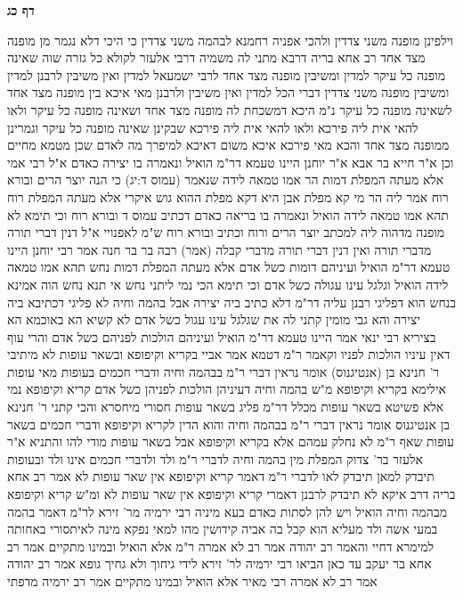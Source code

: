 \documentclass[12pt, openany]{book}
\newcommand{\sethebfont}{
\fontsize{10.5pt}{21.0pt} \selectfont
}
\newcommand{\twocol}[1]{
	{\sethebfont \begin{multicols}{2}
			#1
	\end{multicols}}	
}
\newcommand{\sectname}{}
\newcommand{\newsection}[1]{
	\addcontentsline{toc}{section}{#1}
	\renewcommand{\sectname}{#1}	
	\vspace{-\baselineskip}
	\begin{center}
		\textbf{%
\fontsize{16pt}{16pt}\selectfont
			#1}
	\end{center}
	\vspace{-\baselineskip}
	\nopagebreak
}
\begin{document}
\newsection{דף כג}
\twocol{וילפינן מופנה משני צדדין ולהכי אפניה רחמנא לבהמה משני צדדין כי היכי דלא נגמר מן מופנה מצד אחד 
רב אחא בריה דרבא מתני לה משמיה דרבי אלעזר לקולא כל גזרה שוה שאינה מופנה כל עיקר למדין ומשיבין מופנה מצד אחד לרבי ישמעאל למדין ואין משיבין לרבנן למדין ומשיבין מופנה משני צדדין דברי הכל למדין ואין משיבין 
ולרבנן מאי איכא בין מופנה מצד אחד לשאינה מופנה כל עיקר 
נ"מ היכא דמשכחת לה מופנה מצד אחד ושאינה מופנה כל עיקר ולאו להאי אית ליה פירכא ולאו להאי אית ליה פירכא שבקינן שאינה מופנה כל עיקר וגמרינן ממופנה מצד אחד 
והכא מאי פירכא איכא משום דאיכא למיפרך מה לאדם שכן מטמא מחיים 
וכן א"ר חייא בר אבא א"ר יוחנן היינו טעמא דר"מ הואיל ונאמרה בו יצירה כאדם 
א"ל רבי אמי אלא מעתה המפלת דמות הר אמו טמאה לידה שנאמר (עמוס ד:יג) כי הנה יוצר הרים ובורא רוח אמר ליה הר מי קא מפלת אבן היא דקא מפלת ההוא גוש איקרי
אלא מעתה המפלת רוח תהא אמו טמאה לידה הואיל ונאמרה בו בריאה כאדם דכתיב {עמוס ד } ובורא רוח וכי תימא לא מופנה מדהוה ליה למכתב יוצר הרים ורוח וכתיב ובורא רוח ש"מ לאפנויי 
א"ל דנין דברי תורה מדברי תורה ואין דנין דברי תורה מדברי קבלה 
(אמר) רבה בר בר חנה אמר רבי יוחנן היינו טעמא דר"מ הואיל ועיניהם דומות כשל אדם 
אלא מעתה המפלת דמות נחש תהא אמו טמאה לידה הואיל וגלגל עינו עגולה כשל אדם וכי תימא הכי נמי ליתני נחש 
אי תנא נחש הוה אמינא בנחש הוא דפליגי רבנן עליה דר"מ דלא כתיב ביה יצירה אבל בהמה וחיה לא פליגי דכתיבא ביה יצירה 
והא גבי מומין קתני לה את שגלגל עינו עגול כשל אדם לא קשיא הא באוכמא הא בציריא 
רבי ינאי אמר היינו טעמא דר"מ הואיל ועיניהם הולכות לפניהם כשל אדם והרי עוף דאין עיניו הולכות לפניו וקאמר ר"מ דטמא אמר אביי בקריא וקיפופא ובשאר עופות לא 
מיתיבי ר' חנינא בן (אנטיגנוס) אומר נראין דברי ר"מ בבהמה וחיה ודברי חכמים בעופות
מאי עופות אילימא בקריא וקיפופא מ"ש בהמה וחיה דעיניהן הולכות לפניהן כשל אדם קריא וקיפופא נמי 
אלא פשיטא בשאר עופות מכלל דר"מ פליג בשאר עופות 
חסורי מיחסרא והכי קתני ר' חנינא בן אנטיגנוס אומר נראין דברי ר"מ בבהמה וחיה והוא הדין לקריא וקיפופא ודברי חכמים בשאר עופות שאף ר"מ לא נחלק עמהם אלא בקריא וקיפופא אבל בשאר עופות מודי להו 
והתניא א"ר אלעזר בר' צדוק המפלת מין בהמה וחיה לדברי ר"מ ולד ולדברי חכמים אינו ולד ובעופות תיבדק 
למאן תיבדק לאו לדברי ר"מ דאמר קריא וקיפופא אין שאר עופות לא 
אמר רב אחא בריה דרב איקא לא תיבדק לרבנן דאמרי קריא וקיפופא אין שאר עופות לא 
ומ"ש קריא וקיפופא מבהמה וחיה הואיל ויש להן לסתות כאדם 
בעא מיניה רבי ירמיה מר' זירא לר"מ דאמר בהמה במעי אשה ולד מעליא הוא קבל בה אביה קידושין מהו למאי נפקא מינה לאיתסורי באחותה 
למימרא דחיי והאמר רב יהודה אמר רב לא אמרה ר"מ אלא הואיל ובמינו מתקיים אמר רב אחא בר יעקב עד כאן הביאו רבי ירמיה לר' זירא לידי גיחוך ולא גחיך 
גופא אמר רב יהודה אמר רב לא אמרה רבי מאיר אלא הואיל ובמינו מתקיים אמר רב ירמיה מדפתי
}
\end{document}
